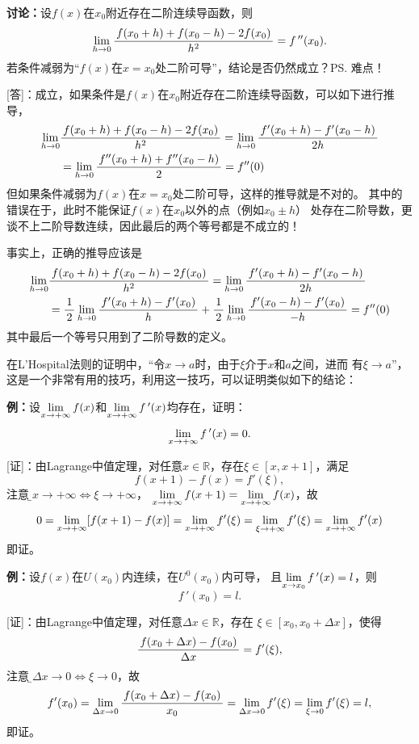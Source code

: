 {\b{\bf 讨论：}设$f(x)$在$x_0$附近存在二阶连续导函数，则
$$\lim\limits_{h\to 0}\displaystyle\frac{\,{f(x_0+h)+f(x_0-h)-2f(x_0)}\,}{\,{h^2}\,}=f\,''(x_0).$$
若条件减弱为“$f(x)$在$x=x_0$处二阶可导”，结论是否仍然成立？\ps{难点！}

[答]：成立，如果条件是$f(x)$在$x_0$附近存在二阶连续导函数，可以如下进行推导，
\begin{align}
	\lim\limits_{h\to 0}&\displaystyle\frac{\,{f(x_0+h)+f(x_0-h)-2f(x_0)}\,}{\,{h^2}\,}
	=\lim\limits_{h\to 0}\displaystyle\frac{\,{f'(x_0+h)-f'(x_0-h)}\,}{\,{2h}\,}\notag\\
	&=\lim\limits_{h\to 0}\displaystyle\frac{\,{f''(x_0+h)+f''(x_0-h)}\,}{\,{2}\,}
	=f''(0)\notag
\end{align}
但如果条件减弱为$f(x)$在$x=x_0$处二阶可导，这样的推导就是不对的。
其中的错误在于，此时不能保证$f(x)$在$x_0$以外的点（例如$x_0\pm h$）
处存在二阶导数，更谈不上二阶导数连续，因此最后的两个等号都是不成立的！

事实上，正确的推导应该是
\begin{align}
	\lim\limits_{h\to 0}&\displaystyle\frac{\,{f(x_0+h)+f(x_0-h)-2f(x_0)}\,}{\,{h^2}\,}
	=\lim\limits_{h\to 0}\displaystyle\frac{\,{f'(x_0+h)-f'(x_0-h)}\,}{\,{2h}\,}\notag\\
	&=\displaystyle\frac{\,{1}\,}{\,{2}\,}\lim\limits_{h\to 0}\displaystyle\frac{\,{f'(x_0+h)-f'(x_0)}\,}{\,{h}\,}
	+\displaystyle\frac{\,{1}\,}{\,{2}\,}\lim\limits_{h\to 0}\displaystyle\frac{\,{f'(x_0-h)-f'(x_0)}\,}{\,{-h}\,}
	=f''(0)\notag
\end{align}
其中最后一个等号只用到了二阶导数的定义。}

在L'Hospital法则的证明中，“令$x\to a$时，由于$\xi$介于$x$和$a$之间，进而
有$\xi\to a$”，这是一个非常有用的技巧，利用这一技巧，可以证明类似如下的结论：

{\bf 例：}设$\lim\limits_{x\to{+\infty}}f(x)$和$\lim\limits_{x\to{+\infty}}f\,'(x)$均存在，证明：
$$\lim\limits_{x\to{+\infty}}f\,'(x)=0.$$

[证]：由Lagrange中值定理，对任意$x\in\mathbb{R}$，存在$\xi\in[x,x+1]$，满足
$$f(x+1)-f(x)=f'(\xi),$$
注意到{\b$x\to+\infty\Leftrightarrow\xi\to+\infty$}，
$\lim\limits_{x\to{+\infty}}f(x+1)=\lim\limits_{x\to{+\infty}}f(x)$，故
$$0=\lim\limits_{x\to{+\infty}}[f(x+1)-f(x)]=\lim\limits_{x\to{+\infty}}f'(\xi)
=\lim\limits_{\xi\to+\infty}f'(\xi)=\lim\limits_{x\to{+\infty}}f'(x)$$
即证。

{\bf 例：}设$f(x)$在$U(x_0)$内连续，在$U^0(x_0)$内可导，
且$\lim\limits_{x\to{x_0}}f\,'(x)=l$，则$$f\,'(x_0)=l.$$

[证]：由Lagrange中值定理，对任意$\Delta x\in\mathbb{R}$，存在
$\xi\in[x_0,x_0+\Delta x]$，使得
$$\displaystyle\frac{\,{f(x_0+\Delta x)-f(x_0)}\,}{\,{\Delta x}\,}=f'(\xi),$$
注意到{\b$\Delta x\to 0\Leftrightarrow\xi\to0$}，故
$$f'(x_0)=\lim\limits_{\Delta x\to 0}\displaystyle\frac{\,{f(x_0+\Delta x)-f(x_0)}\,}{\,{x_0}\,}
=\lim\limits_{\Delta x\to 0}f'(\xi)=\lim\limits_{\xi\to 0}f'(\xi)=l,$$
即证。

